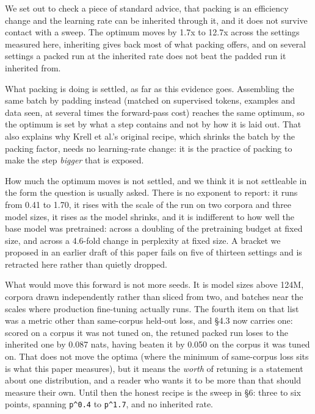 \documentclass[11pt]{article}
\begin{document}
We set out to check a piece of standard advice, that packing is an efficiency change and the learning rate can be inherited through it, and it does not survive contact with a sweep. The optimum moves by 1.7x to 12.7x across the settings measured here, inheriting gives back most of what packing offers, and on several settings a packed run at the inherited rate does not beat the padded run it inherited from.

What packing is doing is settled, as far as this evidence goes. Assembling the same batch by padding instead (matched on supervised tokens, examples and data seen, at several times the forward-pass cost) reaches the same optimum, so the optimum is set by what a step contains and not by how it is laid out. That also explains why Krell et al.'s original recipe, which shrinks the batch by the packing factor, needs no learning-rate change: it is the practice of packing to make the step \emph{bigger} that is exposed.

How much the optimum moves is not settled, and we think it is not settleable in the form the question is usually asked. There is no exponent to report: it runs from 0.41 to 1.70, it rises with the scale of the run on two corpora and three model sizes, it rises as the model shrinks, and it is indifferent to how well the base model was pretrained: across a doubling of the pretraining budget at fixed size, and across a 4.6-fold change in perplexity at fixed size. A bracket we proposed in an earlier draft of this paper fails on five of thirteen settings and is retracted here rather than quietly dropped.

What would move this forward is not more seeds. It is model sizes above 124M, corpora drawn independently rather than sliced from two, and batches near the scales where production fine-tuning actually runs. The fourth item on that list was a metric other than same-corpus held-out loss, and \S{}4.3 now carries one: scored on a corpus it was not tuned on, the retuned packed run loses to the inherited one by 0.087 nats, having beaten it by 0.050 on the corpus it was tuned on. That does not move the optima (where the minimum of same-corpus loss sits is what this paper measures), but it means the \emph{worth} of retuning is a statement about one distribution, and a reader who wants it to be more than that should measure their own. Until then the honest recipe is the sweep in \S{}6: three to six points, spanning \texttt{p\textasciicircum{}0.4} to \texttt{p\textasciicircum{}1.7}, and no inherited rate.
\end{document}
